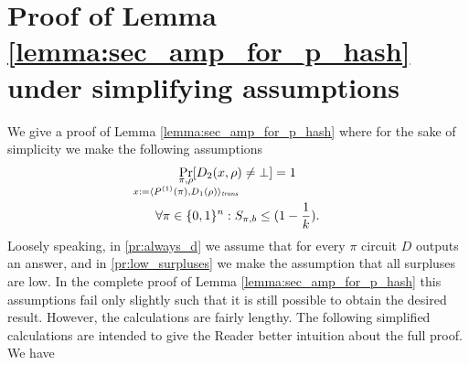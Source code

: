 \section{Proof of Lemma \ref{lemma:sec_amp_for_p_hash} under simplifying assumptions}
We give a proof of Lemma \ref{lemma:sec_amp_for_p_hash} where for the sake of simplicity we make the following assumptions
\begin{gather}
  \label{pr:always_d}
\underset{
  \mathclap{
  \substack{\pi, \rho \\ x := \langle P^{(1)}(\pi), D_1(\rho) \rangle_{\trans}}}}
{\Pr}[D_2(x,\rho) \neq \bot] = 1 \\
  \label{pr:low_surpluses}
\forall \pi \in \{0,1\}^{n} : S_{\pi, b} \leq (1 - \frac{1}{k}).
\end{gather}
Loosely speaking, in \eqref{pr:always_d} we assume that for every $\pi$ circuit $D$ outputs an answer,
and in \eqref{pr:low_surpluses} we make the assumption that all surpluses are low.
In the complete proof of Lemma \ref{lemma:sec_amp_for_p_hash} this assumptions fail only slightly such that it is still possible
to obtain the desired result. However, the calculations are fairly lengthy.
The following simplified calculations are intended to give the Reader better intuition about the full proof.
We have
